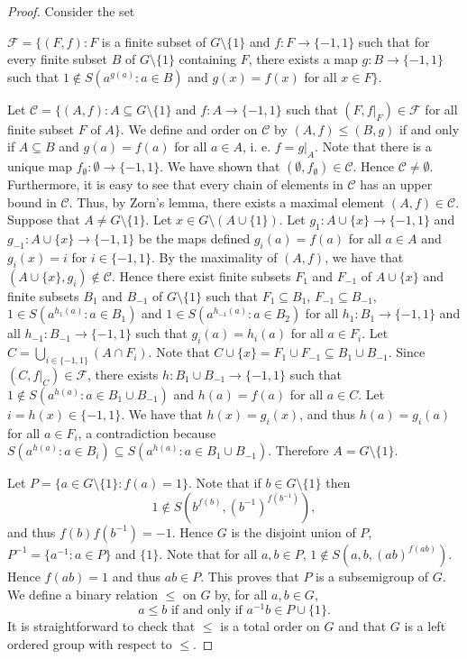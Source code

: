 \begin{proof}
	Consider the set 
	
	$\mathcal{F}=\{ (F,f) : F$ is a finite subset  of $G\setminus\{ 1\}$ and   $f\colon F\to\{ -1, 1\}$ such that for every finite subset $B$ of $G\setminus\{ 1\}$ containing $F$, there exists a map  $g\colon B\to \{ -1,1\}$ such that  $1\notin S(a^{g(a)} : a\in B)$ and $g(x)=f(x)$ for all $x\in F\}$. 
	
	Let $\mathcal{C}=\{ (A,f) : A\subseteq G\setminus\{ 1\}$ and $f\colon A\to \{ -1,1\}$ such that  $(F,f|_F)\in\mathcal{F}$ for all finite subset $F\text{ of }A \}$. We define and order on $\mathcal{C}$ by $(A,f)\leq (B,g)$ if and only if $A\subseteq B$ and $g(a)=f(a)$ for all $a\in A$, i. e. $f=g|_A$. Note that there is a unique map $f_{\emptyset}\colon \emptyset\to \{-1,1\}$. We have shown that $(\emptyset,f_{\emptyset})\in\mathcal{C}$. Hence $\mathcal{C}\neq \emptyset$. Furthermore, it is easy to see that every chain of elements in $\mathcal{C}$ has an upper bound in $\mathcal{C}$. Thus, by Zorn's lemma, there exists a maximal element $(A,f)\in\mathcal{C}$. Suppose that $A\neq G\setminus\{ 1\}$. Let $x\in G\setminus (A\cup\{ 1\})$. Let $g_1\colon A\cup\{ x\}\to\{ -1,1\}$ and $g_{-1}\colon A\cup\{ x\}\to\{ -1,1\}$ be the maps defined $g_i(a)=f(a)$ for all $a\in A$ and $g_i(x)=i$ for $i\in\{ -1,1\}$. By the maximality of $(A,f)$, we have that $(A\cup\{ x\}, g_i)\not\in\mathcal{C}$. Hence there exist finite subsets $F_1$ and $F_{-1}$ of $A\cup \{ x\}$ and finite subsets $B_1$ and $B_{-1}$ of $G\setminus\{ 1\}$ such that $F_1\subseteq B_1$, $F_{-1}\subseteq B_{-1}$, $1\in S(a^{h_1(a)}: a\in B_1)$ and $1\in S(a^{h_{-1}(a)}:a\in B_2)$ for all $h_1\colon B_1\to\{ -1,1\}$ and all $h_{-1}\colon B_{-1}\to \{ -1,1\}$ such that $g_i(a)=h_i(a)$ for all $a\in F_i$. Let $C=\bigcup_{i\in\{ -1,1\}}(A\cap F_i)$. Note that $C\cup\{ x\}=F_1\cup F_{-1}\subseteq B_1\cup B_{-1}$. Since $(C,f|_{C})\in \mathcal{F}$, there exists $h\colon B_1\cup B_{-1}\to\{ -1,1\}$ such that $1\notin S(a^{h(a)}: a\in B_1\cup B_{-1})$ and $h(a)=f(a)$ for all $a\in C$. Let $i=h(x)\in\{ -1,1\}$. We have that $h(x)=g_i(x)$, and thus $h(a)=g_i(a)$ for all $a\in F_i$, a contradiction because $S(a^{h(a)}:a\in B_i)\subseteq S(a^{h(a)}: a\in B_1\cup B_{-1})$.
	Therefore $A=G\setminus\{ 1\}$. 
	
	Let $P=\{a\in G\setminus \{1\} : f(a)=1\}$. Note that if $b\in G\setminus\{ 1\}$ then 
	\[1\notin S(b^{f(b)},(b^{-1})^{f(b^{-1})}),\] 
	and thus $f(b)f(b^{-1})=-1$. Hence $G$ is the disjoint union of $P$, $P^{-1}=\{ a^{-1} : a\in P\}$ and $\{ 1\}$. Note that for all $a,b\in P$, $1\notin S(a,b,(ab)^{f(ab)})$. Hence $f(ab)=1$ and thus $ab\in P$. This proves that $P$ is a subsemigroup of $G$. We define a binary relation $\leq$ on $G$ by, for all $a,b\in G$,
	\[ a\leq b\text{ if and only if }a^{-1}b\in P\cup\{ 1\}.\]
	It is straightforward to check that $\leq$ is a total order on $G$ and that $G$ is a left ordered group with respect to $\leq$.
\end{proof}

